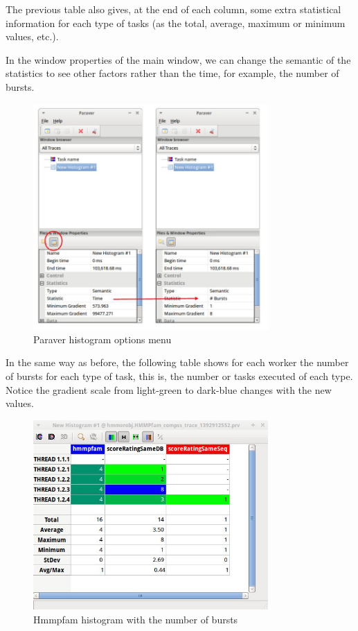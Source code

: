 The previous table also gives, at the end of each column, some extra statistical 
information for each type of tasks (as the total, average, maximum or minimum values, etc.).

\newpage
In the window properties of the main window, we can change the semantic of the statistics 
to see other factors rather than the time, for example, the number of bursts.

\begin{figure}[ht!]
  \centering
    \includegraphics[width=0.8\textwidth]{./Sections/5_Analysis/Figures/14.jpeg}
    \caption{Paraver histogram options menu}
\end{figure}

\newpage
In the same way as before, the following table shows for each worker the number of bursts 
for each type of task, this is, the number or tasks executed of each type. Notice the gradient 
scale from light-green to dark-blue changes with the new values.

\begin{figure}[ht!]
  \centering
    \includegraphics[width=0.8\textwidth]{./Sections/5_Analysis/Figures/15.jpeg}
    \caption{Hmmpfam histogram with the number of bursts}
\end{figure}